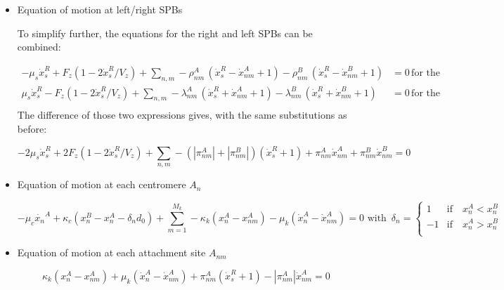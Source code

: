 \documentclass[a4paper,12pt]{article}
\begin{document}
\begin{itemize}

\item Equation of motion at left/right SPBs

To simplify further, the equations for the right and left SPBs can be
combined:

\begin{equation}
  \begin{aligned}
    - \mu_s\dot{x}^R_s + F_{z}\left(1 - 2\dot{x}^R_s/V_z\right)%
    + \sum_{n,m} - \rho_{nm}^A\,\left(\dot{x}^R_s - \dot{x}^A_{nm} +%
      1\right) - \rho_{nm}^B\,\left(\dot{x}^R_s - \dot{x}^B_{nm} +%
      1\right)&= 0 \, \mbox{for the right SPB}\\
    \mu_s\dot{x}^R_s - F_{z}\left(1 - 2\dot{x}^R_s/V_z\right)%
    + \sum_{n,m} -\lambda_{nm}^A\,\left(\dot{x}^R_s + \dot{x}^A_{nm} +%
      1\right) - \lambda_{nm}^B\,\left(\dot{x}^R_s + \dot{x}^B_{nm} +%
      1\right) &= 0 \, \mbox{for the left SPB}\\
  \end{aligned}
\end{equation}
The difference of those two expressions gives, with the same substitutions as before:

\begin{equation}
  \label{eq:spindle_term}
  - 2\mu_s\dot{x}^R_s + 2F_{z}\left(1 - 2\dot{x}^R_s/V_z\right)%
  + \sum_{n,m}- (|\pi_{nm}^A|  + |\pi_{nm}^B|)(\dot{x}^R_s + 1)%
  + \pi_{nm}^A \dot{x}_{nm}^A + \pi_{nm}^B \dot{x}_{nm}^B= 0%
\end{equation}


\item Equation of motion at each centromere $A_n$

\begin{equation}
-\mu_c \dot{x_n}^A+\kappa_c (x_n^B - x_n^A - \delta_n d_0) + \sum_{m = 1}^{M_k} -\kappa_k(x_n^A - x_{nm}^A)
  - \mu_k(\dot{x}_n^A - \dot{x}_{nm}^A) = 0  %
    \mbox{ with }\, \delta_n =%
    \begin{cases}
      1  &\mathrm{if}\quad  x_n^A < x_n^B\\
      -1 &\mathrm{if}\quad  x_n^A > x_n^B\\
    \end{cases}
\end{equation}

\item Equation of motion at each attachment site $A_{nm}$

\begin{equation}
\kappa_k(x_n^A - x_{nm}^A) + \mu_k(\dot{x}_n^A - \dot{x}_{nm}^A) + \pi_{nm}^A(\dot{x}^R_s + 1) - |\pi_{nm}^A|\dot{x}^A_{nm} = 0
\end{equation}





\end{itemize}
\end{document}
